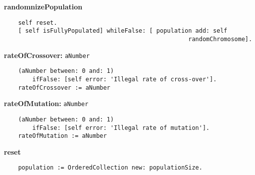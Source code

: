 {\bf randomnizePopulation}
\begin{verbatim}
    self reset.
    [ self isFullyPopulated] whileFalse: [ population add: self 
                                                    randomChromosome].
\end{verbatim}
{\bf rateOfCrossover:} {\tt aNumber}
\begin{verbatim}
    (aNumber between: 0 and: 1) 
        ifFalse: [self error: 'Illegal rate of cross-over'].
    rateOfCrossover := aNumber
\end{verbatim}
{\bf rateOfMutation:} {\tt aNumber}
\begin{verbatim}
    (aNumber between: 0 and: 1) 
        ifFalse: [self error: 'Illegal rate of mutation'].
    rateOfMutation := aNumber
\end{verbatim}
{\bf reset}
\begin{verbatim}
    population := OrderedCollection new: populationSize.
\end{verbatim}

